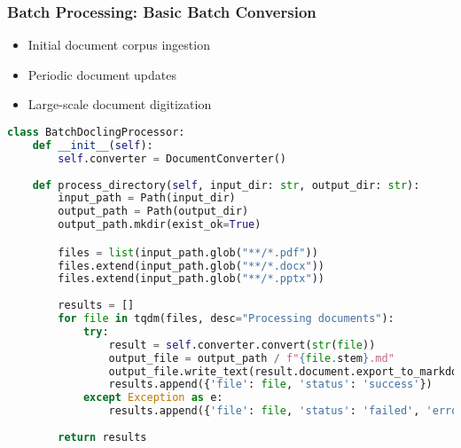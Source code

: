 \begin{frame}[fragile]\frametitle{Batch Processing: Basic Batch Conversion}

        \begin{itemize}
            \item Initial document corpus ingestion
            \item Periodic document updates
            \item Large-scale document digitization
        \end{itemize}

\begin{lstlisting}[language=Python, basicstyle=\tiny]
class BatchDoclingProcessor:
    def __init__(self):
        self.converter = DocumentConverter()
        
    def process_directory(self, input_dir: str, output_dir: str):
        input_path = Path(input_dir)
        output_path = Path(output_dir)
        output_path.mkdir(exist_ok=True)

        files = list(input_path.glob("**/*.pdf"))
        files.extend(input_path.glob("**/*.docx"))
        files.extend(input_path.glob("**/*.pptx"))
        
        results = []
        for file in tqdm(files, desc="Processing documents"):
            try:
                result = self.converter.convert(str(file))
                output_file = output_path / f"{file.stem}.md"
                output_file.write_text(result.document.export_to_markdown())
                results.append({'file': file, 'status': 'success'})
            except Exception as e:
                results.append({'file': file, 'status': 'failed', 'error': str(e)})
        
        return results
\end{lstlisting}
\end{frame}

